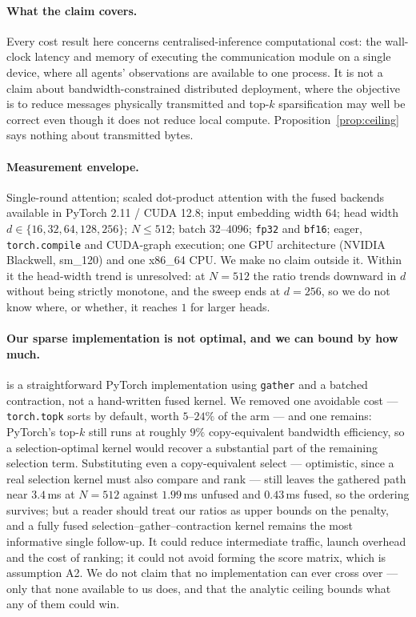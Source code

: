 \paragraph{What the claim covers.} Every cost result here concerns
centralised-inference computational cost: the wall-clock latency and memory of
executing the communication module on a single device, where all agents'
observations are available to one process. It is not a claim about
bandwidth-constrained distributed deployment, where the objective is to reduce
messages physically transmitted and top-$k$ sparsification may well be correct
even though it does not reduce local compute. Proposition~\ref{prop:ceiling}
says nothing about transmitted bytes.

\paragraph{Measurement envelope.} Single-round attention; scaled dot-product
attention with the fused backends available in PyTorch 2.11 / CUDA 12.8; input
embedding width $64$; head width $d \in \{16,32,64,128,256\}$; $N \le 512$;
batch $32$--$4096$; \texttt{fp32} and \texttt{bf16}; eager,
\texttt{torch.compile} and CUDA-graph execution; one GPU architecture (NVIDIA
Blackwell, sm\_120) and one x86\_64 CPU. We make no claim outside it. Within it
the head-width trend is unresolved: at $N{=}512$ the ratio trends downward in
$d$ without being strictly monotone, and the sweep ends at $d{=}256$, so we do
not know where, or whether, it reaches $1$ for larger heads.

\paragraph{Our sparse implementation is not optimal, and we can bound by how
much.} \Gath{} is a straightforward PyTorch implementation using
\texttt{gather} and a batched contraction, not a hand-written fused kernel. We
removed one avoidable cost --- \texttt{torch.topk} sorts by default, worth
$5$--$24\%$ of the arm --- and one remains: PyTorch's top-$k$ still runs at
roughly $9\%$ copy-equivalent bandwidth efficiency, so a selection-optimal
kernel would recover a substantial part of the remaining selection term.
Substituting even a copy-equivalent select --- optimistic, since a real
selection kernel must also compare and rank --- still leaves the gathered path
near $3.4$\,ms at $N{=}512$ against $1.99$\,ms unfused and $0.43$\,ms fused, so
the ordering survives; but a reader should treat our ratios as upper bounds on
the penalty, and a fully fused selection--gather--contraction kernel remains
the most informative single follow-up. It could reduce intermediate traffic,
launch overhead and the cost of ranking; it could not avoid forming the score
matrix, which is assumption A2. We do not claim that no implementation can ever
cross over --- only that none available to us does, and that the analytic
ceiling bounds what any of them could win.

